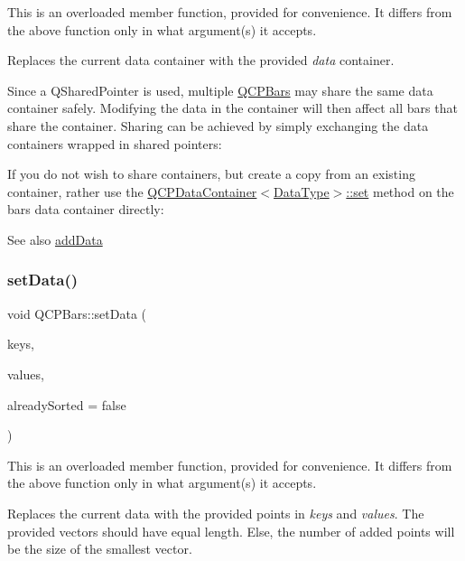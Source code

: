 This is an overloaded member function, provided for convenience. It differs from the above function only in what argument(s) it accepts.

Replaces the current data container with the provided {\itshape data} container.

Since a Q\+Shared\+Pointer is used, multiple \hyperlink{class_q_c_p_bars}{Q\+C\+P\+Bars} may share the same data container safely. Modifying the data in the container will then affect all bars that share the container. Sharing can be achieved by simply exchanging the data containers wrapped in shared pointers\+: 
\begin{DoxyCodeInclude}
\end{DoxyCodeInclude}
 If you do not wish to share containers, but create a copy from an existing container, rather use the \hyperlink{class_q_c_p_data_container_ae7042bd534fc3ce7befa2ce3f790b5bf}{Q\+C\+P\+Data\+Container$<$\+Data\+Type$>$\+::set} method on the bar\textquotesingle{}s data container directly\+: 
\begin{DoxyCodeInclude}
\end{DoxyCodeInclude}
 \begin{DoxySeeAlso}{See also}
\hyperlink{class_q_c_p_bars_a323d6970d6d6e3166d89916a7f60f733}{add\+Data} 
\end{DoxySeeAlso}
\mbox{\label{class_q_c_p_bars_a2a88cd5b16ec7b71e5a590f95b50c5ce}} 
\subsubsection{\texorpdfstring{set\+Data()}{setData()}\hspace{0.1cm}{\footnotesize\ttfamily [2/2]}}
{\footnotesize\ttfamily void Q\+C\+P\+Bars\+::set\+Data (\begin{DoxyParamCaption}\item[{const Q\+Vector$<$ double $>$ \&}]{keys,  }\item[{const Q\+Vector$<$ double $>$ \&}]{values,  }\item[{bool}]{already\+Sorted = {\ttfamily false} }\end{DoxyParamCaption})}

This is an overloaded member function, provided for convenience. It differs from the above function only in what argument(s) it accepts.

Replaces the current data with the provided points in {\itshape keys} and {\itshape values}. The provided vectors should have equal length. Else, the number of added points will be the size of the smallest vector.

